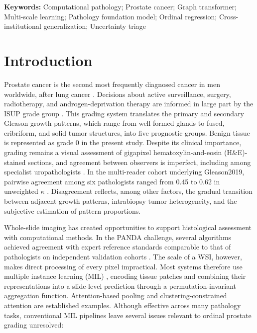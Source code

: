 \documentclass[11pt,a4paper]{article}
\begin{document}
\vspace{0.5em}
\noindent \textbf{Keywords:} Computational pathology; Prostate cancer; Graph transformer; Multi-scale learning; Pathology foundation model; Ordinal regression; Cross-institutional generalization; Uncertainty triage

\vspace{1em}

\section{Introduction}
Prostate cancer is the second most frequently diagnosed cancer in men worldwide, after lung cancer \cite{ref1}. Decisions about active surveillance, surgery, radiotherapy, and androgen-deprivation therapy are informed in large part by the ISUP grade group \cite{ref2, ref3}. This grading system translates the primary and secondary Gleason growth patterns, which range from well-formed glands to fused, cribriform, and solid tumor structures, into five prognostic groups. Benign tissue is represented as grade 0 in the present study. Despite its clinical importance, grading remains a visual assessment of gigapixel hematoxylin-and-eosin (H\&E)-stained sections, and agreement between observers is imperfect, including among specialist uropathologists \cite{ref4}. In the multi-reader cohort underlying Gleason2019, pairwise agreement among six pathologists ranged from 0.45 to 0.62 in unweighted $\kappa$ \cite{ref5}. Disagreement reflects, among other factors, the gradual transition between adjacent growth patterns, intrabiopsy tumor heterogeneity, and the subjective estimation of pattern proportions.

Whole-slide imaging has created opportunities to support histological assessment with computational methods. In the PANDA challenge, several algorithms achieved agreement with expert reference standards comparable to that of pathologists on independent validation cohorts \cite{ref6}. The scale of a WSI, however, makes direct processing of every pixel impractical. Most systems therefore use multiple instance learning (MIL) \cite{ref7, ref8}, encoding tissue patches and combining their representations into a slide-level prediction through a permutation-invariant aggregation function. Attention-based pooling \cite{ref7} and clustering-constrained attention \cite{ref8} are established examples. Although effective across many pathology tasks, conventional MIL pipelines leave several issues relevant to ordinal prostate grading unresolved:
\end{document}
